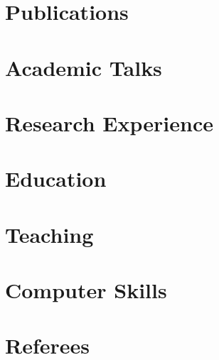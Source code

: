 \documentclass[letter,10pt]{article}
\begin{document}


\section{Publications}


\section{Academic Talks}


\section{Research Experience}


\section{Education}


\section{Teaching}


\section{Computer Skills}


\section{Referees}

\end{document}
